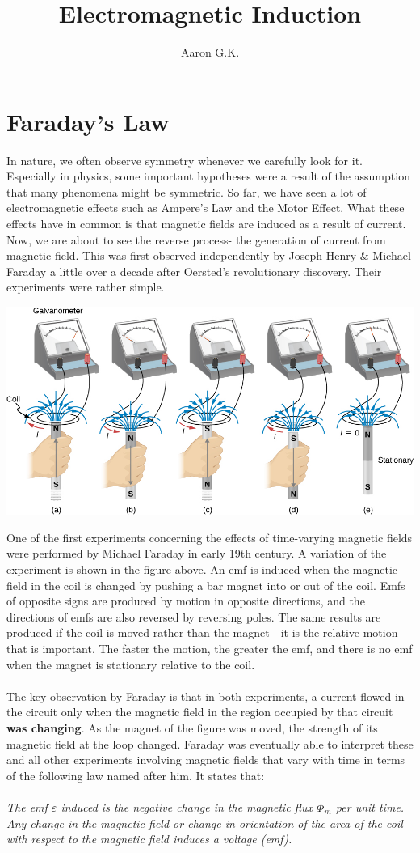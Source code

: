 \documentclass[9pt]{article}
\title{Electromagnetic Induction}
\author{Aaron G.K.}
\begin{document}
	\maketitle
	\section*{Faraday's Law}
	In nature, we often observe symmetry whenever we carefully look for it. Especially in physics, some important hypotheses were a result of the assumption that many phenomena might be symmetric. So far, we have seen a lot of electromagnetic effects such as Ampere's Law and the Motor Effect. What these effects have in common is that magnetic fields are induced as a result of current. Now, we are about to see the reverse process- the generation of current from magnetic field. This was first observed independently by Joseph Henry \& Michael Faraday a little over a decade after Oersted's revolutionary discovery. Their experiments were rather simple.
	\begin{center}
		\includegraphics[scale=0.6]{FaradayExp}
	\end{center}
	One of the first experiments concerning the effects of time-varying magnetic fields were performed by Michael Faraday in early 19th century. A variation of the experiment is shown in the figure above. An emf is induced when the magnetic field in the coil is changed by pushing a bar magnet into or out of the coil. Emfs of opposite signs are produced by motion in opposite directions, and the directions of emfs are also reversed by reversing poles. The same results are produced if the coil is moved rather than the magnet—it is the relative motion that is important. The faster the motion, the greater the emf, and there is no emf when the magnet is stationary relative to the coil. \\ \\
	The key observation by Faraday is that in both experiments, a current flowed in the circuit only when the magnetic field in the region occupied by that circuit \textbf{was changing}. As the magnet of the figure was moved, the strength of its magnetic field at the loop changed. Faraday was eventually able to interpret these and all other experiments involving magnetic fields that vary with time in terms of the following law named after him. It states that: \\ \\
	\textit{The emf $\varepsilon$ induced is the negative change in the magnetic flux  $\Phi_m$ per unit time. Any change in the magnetic field or change in orientation of the area of the coil with respect to the magnetic field induces a voltage (emf).} 
\end{document}
